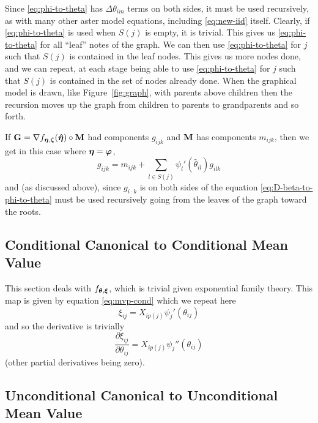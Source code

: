 Since \eqref{eq:phi-to-theta} has $\Delta \theta_{i m}$ terms on both
sides, it must be used recursively, as with many other aster
model equations, including \eqref{eq:new-iid} itself.
Clearly, if \eqref{eq:phi-to-theta} is used when $S(j)$ is empty,
it is trivial.  This gives us \eqref{eq:phi-to-theta} for all ``leaf''
notes of the graph.  We can then use \eqref{eq:phi-to-theta} for $j$
such that $S(j)$ is contained in the leaf nodes.  This gives us more
nodes done, and we can repeat, at each stage being able to use
\eqref{eq:phi-to-theta} for $j$ such that $S(j)$ is contained in the
set of nodes already done.  When the graphical model is drawn,
like Figure~\ref{fig:graph}, with
parents above children then the recursion moves up the graph
from children to parents to grandparents and so forth.

If $\mathbf{G} = \nabla f_{{\boldsymbol{\eta}}, {\boldsymbol{\zeta}}}({\boldsymbol{\hat{\eta}}}) \circ \mathbf{M}$
had components $g_{i j k}$ and $\mathbf{M}$ has components $m_{i j k}$, then
we get in this case where ${\boldsymbol{\eta}} = {\boldsymbol{\varphi}}$,
\begin{equation} \label{eq:D-beta-to-phi-to-theta}
   g_{i j k}
   =
   m_{i j k}
   +
   \sum_{l \in S(j)} \psi_l'(\hat{\theta}_{i l}) g_{i l k}
\end{equation}
and (as discussed above), since $g_{i \cdot k}$ is on both sides of
the equation \eqref{eq:D-beta-to-phi-to-theta} must be used recursively
going from the leaves of the graph toward the roots.

\subsection{Conditional Canonical to Conditional Mean Value}

This section deals with $f_{{\boldsymbol{\theta}}, {\boldsymbol{\xi}}}$, which is trivial
given exponential family theory.  This map is given by
equation \eqref{eq:mvp-cond} which we repeat here
$$
   \xi_{i j} = X_{i p(j)} \psi_j'(\theta_{i j})
$$
and so the derivative is trivially
\begin{equation} \label{eq:theta-to-xi}
   \frac{\partial \xi_{i j}}{\partial \theta_{i j}}
   =
   X_{i p(j)} \psi_j''(\theta_{i j})
\end{equation}
(other partial derivatives being zero).

\subsection{Unconditional Canonical to Unconditional Mean Value}

